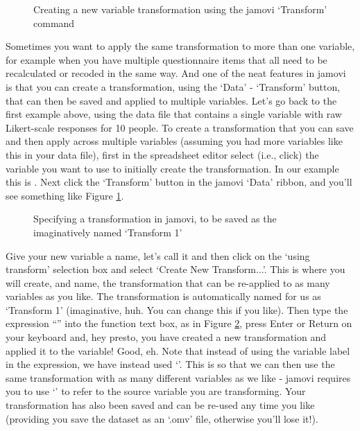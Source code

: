 \begin{figure}[p]
\begin{center}
\caption{Creating a new variable transformation using the jamovi `Transform' command}
\label{fig:transform1}
\HR
\end{center}
\end{figure}

Sometimes you want to apply the same transformation to more than one variable, for example when you have multiple questionnaire items that all need to be recalculated or recoded in the same way. And one of the neat features in jamovi is that you can create a transformation, using the `Data' - `Transform' button, that can then be saved and  applied to multiple variables. Let's go back to the first example above, using the data file  that contains a single variable with raw Likert-scale responses for 10 people. To create a transformation that you can save and then apply across multiple variables (assuming you had more variables like this in your data file), first in the spreadsheet editor select (i.e., click) the variable you want to use to initially create the transformation. In our example this is . Next click the `Transform' button in the jamovi `Data' ribbon, and you'll see something like Figure \ref{fig:transform1}. 

\begin{figure}[!!htb]
\begin{center}
\caption{Specifying a transformation in jamovi, to be saved as the imaginatively named `Transform 1'}
\label{fig:transform2}
\HR
\end{center}
\end{figure}

Give your new variable a name, let's call it  and then click on the `using transform' selection box and select `Create New Transform...'. This is where you will create, and name, the transformation that can be re-applied to as many variables as you like. The transformation is automatically named for us as `Transform 1' (imaginative, huh. You can change this if you like). Then type the expression ``'' into the function text box, as in Figure \ref{fig:transform2}, press Enter or Return on your keyboard and, hey presto, you have created a new transformation and applied it to the  variable! Good, eh. Note that instead of using the variable label in the expression, we have instead used `'. This is so that we can then use the same transformation with as many different variables as we like - jamovi requires you to use `' to refer to the source variable you are transforming.  Your transformation has also been saved and can be re-used any time you like (providing you save the dataset as an `.omv' file, otherwise you'll lose it!).


